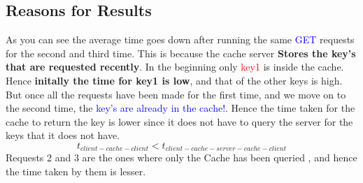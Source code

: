 \subsection{Reasons for Results}
As you can see the average time goes down after running the same \textcolor{blue}{GET} requests for the second and third time. This is because
the cache server \textbf{Stores the key's that are requested recently}. In the beginning only \textcolor{red}{key1} is inside the cache. Hence \textbf{initally the time for 
key1 is low}, and that of the other keys is high. But once all the requests have been made for the first time, and we move on to the second time, the
\textcolor{blue}{key's are already in the cache!}. Hence the time taken for the cache to return the key is lower since it does not have to query the server for the keys
that it does not have.
\begin{equation*}
    t_{client - cache- client} < t_{client-cache-server-cache-client}
\end{equation*}
Requests 2 and 3 are the ones where only the Cache has been queried , and hence the time taken by them is lesser.
